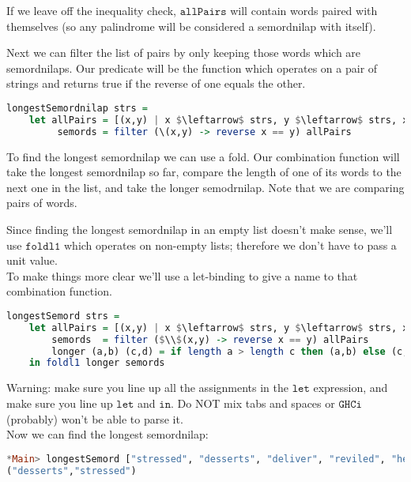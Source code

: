 \documentclass[a4paper,12pt]{article}
\newcommand{\kwa}[1]{\mathtt{#1}}
\begin{document}
\noindent
If we leave off the inequality check, $\kwa{allPairs}$ will contain words paired with themselves (so any palindrome will be considered a semordnilap with itself).

\noindent
Next we can filter the list of pairs by only keeping those words which are semordnilaps. Our predicate will be the function which operates on a pair of strings and returns true if the reverse of one equals the other.

\begin{lstlisting}[language=Haskell]
longestSemordnilap strs =
	let allPairs = [(x,y) | x $\leftarrow$ strs, y $\leftarrow$ strs, x /= y]
	     semords = filter (\(x,y) -> reverse x == y) allPairs
\end{lstlisting}

\noindent
To find the longest semordnilap we can use a fold. Our combination function will take the longest semordnilap so far, compare the length of one of its words to the next one in the list, and take the longer semodrnilap. Note that we are comparing pairs of words.

\noindent
Since finding the longest semordnilap in an empty list doesn't make sense, we'll use $\kwa{foldl1}$ which operates on non-empty lists; therefore we don't have to pass a unit value. \\

\noindent
To make things more clear we'll use a let-binding to give a name to that combination function.

\begin{lstlisting}[language=Haskell]
longestSemord strs =
	let allPairs = [(x,y) | x $\leftarrow$ strs, y $\leftarrow$ strs, x /= y]
        semords  = filter ($\\$(x,y) -> reverse x == y) allPairs
        longer (a,b) (c,d) = if length a > length c then (a,b) else (c,d)
    in foldl1 longer semords
\end{lstlisting}

\noindent
Warning: make sure you line up all the assignments in the $\kwa{let}$ expression, and make sure you line up $\kwa{let}$ and $\kwa{in}$. Do NOT mix tabs and spaces or $\kwa{GHCi}$ (probably) won't be able to parse it. \\

\noindent
Now we can find the longest semordnilap:

\begin{lstlisting}[language=Haskell]
*Main> longestSemord ["stressed", "desserts", "deliver", "reviled", "hello"]
("desserts","stressed")
\end{lstlisting}
\end{document}
